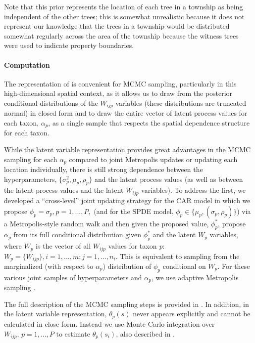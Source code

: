 \documentclass[10pt,letterpaper]{article}
\begin{document}
Note that this prior represents the location of each tree in a township
as being independent of the other trees; this is somewhat unrealistic
because it does not represent our knowledge that the trees in a township
would be distributed somewhat regularly across the area of the township
because the witness trees were used to indicate property boundaries.


\paragraph*{Computation}

The representation of \cite{McCu:Ross:1994} is convenient for MCMC sampling,
particularly in this high-dimensional spatial context, as it allows
us to draw from the posterior conditional distributions of the $W_{ijp}$
variables (these distributions are truncated normal) in closed form
and to draw the entire vector of latent process values for each taxon,
$\alpha_{p}$, as a single sample that respects the spatial dependence
structure for each taxon.

While the latent variable representation provides great advantages
in the MCMC sampling for each $\alpha_{p}$ compared to joint Metropolis
updates or updating each location individually, there is still strong
dependence between the hyperparameters, $\{\sigma_{p}^{2},\mu_{p},\rho_{p}\}$
and the latent process values (as well as between the latent process
values and the latent $W_{ijp}$ variables). To address the first,
we developed a ``cross-level'' joint updating strategy for the CAR
model in which we propose $\phi_{p}=\sigma_{p},p=1,\ldots,P,$ (and
for the SPDE model, $\phi_{p}\in\{\mu_{p},(\sigma_{p},\rho_{p})\}$)
via a Metropolis-style random walk and then given the proposed value,
$\phi_{p}^{*}$, propose $\alpha_{p}$ from its full conditional distribution
given $\phi_{p}^{*}$ and the latent $W_{p}$ variables, where $W_{p}$
is the vector of all $W_{ijp}$ values for taxon \emph{p}: $W_{p}=\{W_{ijp}\},i=1,\ldots,m;j=1,\ldots,n_{i}$.
This is equivalent to sampling from the marginalized (with respect
to $\alpha_{p}$) distribution of $\phi_{p}$ conditional on $W_{p}$.
For these various joint samples of hyperparameters and $\alpha_{p}$,
we use adaptive Metropolis sampling \cite{Shab:Well:2011}.

The full description of the MCMC sampling steps is provided in
. In addition, in the latent variable representation, $\theta_{p}(s)$
never appears explicitly and cannot be calculated in close form. Instead
we use Monte Carlo integration over $W_{ijp},\, p=1,\ldots,P$ to
estimate $\theta_{p}(s_{i})$, also described in .
\end{document}
